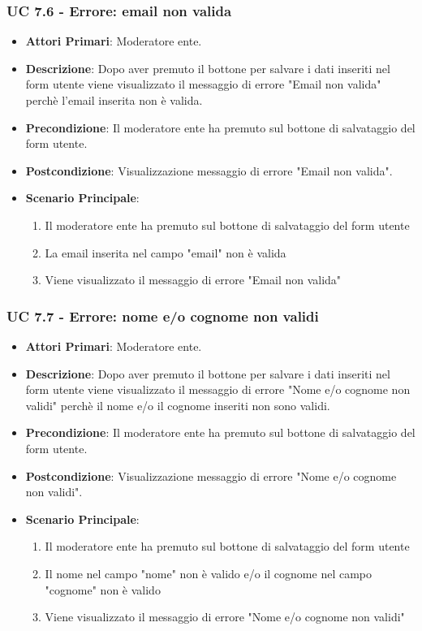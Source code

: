 			\subsubsection{UC 7.6 - Errore: email non valida}
			\begin{itemize}
				\item \textbf{Attori Primari}: Moderatore ente.
				\item \textbf{Descrizione}: Dopo aver premuto il bottone per salvare i dati inseriti nel form utente viene visualizzato il messaggio di errore "Email non valida" perchè l'email inserita non è valida. 
				\item \textbf{Precondizione}: Il moderatore ente ha premuto sul bottone di salvataggio del form utente.
				\item \textbf{Postcondizione}: Visualizzazione messaggio di errore "Email non valida".
				\item \textbf{Scenario Principale}:
				\begin{enumerate}
					\item{Il moderatore ente ha premuto sul bottone di salvataggio del form utente}
					\item{La email inserita nel campo "email" non è valida}
					\item{Viene visualizzato il messaggio di errore "Email non valida"}
				\end{enumerate}	
			\end{itemize}
			
			\subsubsection{UC 7.7 - Errore: nome e/o cognome non validi}
			\begin{itemize}
				\item \textbf{Attori Primari}: Moderatore ente.
				\item \textbf{Descrizione}: Dopo aver premuto il bottone per salvare i dati inseriti nel form utente viene visualizzato il messaggio di errore "Nome e/o cognome non validi" perchè il nome e/o il cognome inseriti non sono validi. 
				\item \textbf{Precondizione}: Il moderatore ente ha premuto sul bottone di salvataggio del form utente.
				\item \textbf{Postcondizione}: Visualizzazione messaggio di errore "Nome e/o cognome non validi".
				\item \textbf{Scenario Principale}:
				\begin{enumerate}
					\item{Il moderatore ente ha premuto sul bottone di salvataggio del form utente}
					\item{Il nome nel campo "nome" non è valido e/o il cognome nel campo "cognome" non è valido}
					\item{Viene visualizzato il messaggio di errore "Nome e/o cognome non validi"}
				\end{enumerate}	
			\end{itemize}
			
